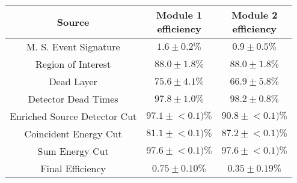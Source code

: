 \begin{tabular}{|c|c|c|}
\hline
  Source & \makecell{Module 1\\efficiency} & \makecell{Module 2\\efficiency} \\
\hline
  M. S. Event Signature & $1.6 \pm 0.2\%$ & $0.9 \pm 0.5\%$ \\
  Region of Interest & $88.0 \pm 1.8\%$ & $88.0 \pm 1.8\%$ \\
  Dead Layer & $75.6 \pm 4.1\%$ & $66.9 \pm 5.8\%$ \\
  Detector Dead Times & $97.8 \pm 1.0\%$ & $98.2 \pm 0.8\%$ \\
  Enriched Source Detector Cut & $97.1 \pm{}<\!0.1)\%$ & $90.8 \pm{}<\!0.1)\%$ \\
  Coincident Energy Cut & $81.1 \pm{}<\!0.1)\%$ & $87.2 \pm{}<\!0.1)\%$ \\
  Sum Energy Cut & $97.6 \pm{}<\!0.1)\%$ & $97.6 \pm{}<\!0.1)\%$ \\
  \hline Final Efficiency & $0.75 \pm 0.10\%$ & $0.35 \pm 0.19\%$ \\
\hline
\end{tabular}
